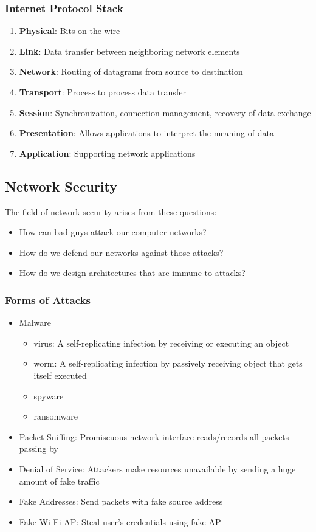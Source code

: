 \documentclass{article}
\begin{document}
\subsubsection{Internet Protocol Stack}
\begin{enumerate}
    \item \textbf{Physical}: Bits on the wire
    \item \textbf{Link}: Data transfer between neighboring network elements
    \item \textbf{Network}: Routing of datagrams from source to destination
    \item \textbf{Transport}: Process to process data transfer
    \item \textbf{Session}: Synchronization, connection management, recovery of data exchange
    \item \textbf{Presentation}: Allows applications to interpret the meaning of data
    \item \textbf{Application}: Supporting network applications
\end{enumerate}

\subsection{Network Security}
The field of network security arises from these questions:
\begin{itemize}
    \item How can bad guys attack our computer networks?
    \item How do we defend our networks against those attacks?
    \item How do we design architectures that are immune to attacks?
\end{itemize}

\subsubsection{Forms of Attacks}
\begin{itemize}
    \item Malware
    \begin{itemize}
        \item virus: A self-replicating infection by receiving or executing an object
        \item worm: A self-replicating infection by passively receiving object that gets itself executed
        \item spyware
        \item ransomware
    \end{itemize}
    \item Packet Sniffing: Promiscuous network interface reads/records all packets passing by
    \item Denial of Service: Attackers make resources unavailable by sending a huge amount of fake traffic
    \item Fake Addresses: Send packets with fake source address
    \item Fake Wi-Fi AP: Steal user's credentials using fake AP
\end{itemize}
\end{document}

